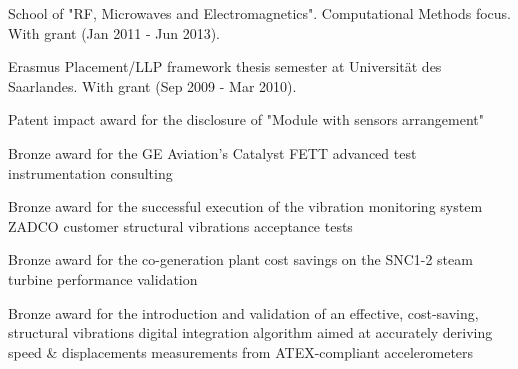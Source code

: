 \documentclass[9pt,a4paper,ragged2e,withhyper]{altacv} %
\begin{document}
\begin{paracol}{2}

\switchcolumn

School of "RF, Microwaves and Electromagnetics". Computational Methods focus. With grant (Jan 2011 - Jun 2013).

\divider

Erasmus Placement/LLP framework thesis semester at Universit\"at des Saarlandes.
With grant (Sep 2009 - Mar 2010).

\divider



\divider

{Patent impact award for the disclosure of "Module with sensors arrangement"}
\divider

{Bronze award for the GE Aviation's Catalyst FETT advanced test instrumentation consulting}
\divider

{Bronze award for the successful execution of the vibration monitoring system ZADCO customer structural vibrations acceptance tests}
\divider

{Bronze award for the co-generation plant cost savings on the SNC1-2 steam turbine performance validation}
\divider

{Bronze award for the introduction and validation of an effective, cost-saving, structural vibrations digital integration algorithm aimed at accurately deriving speed \& displacements measurements from ATEX-compliant accelerometers}
\divider


\end{paracol}
\end{document}
